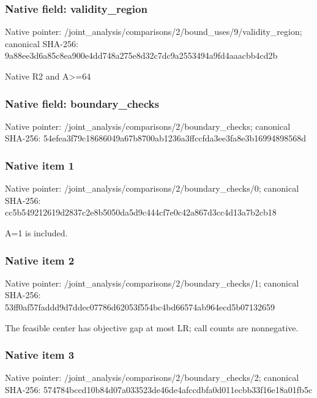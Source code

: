 \documentclass[10pt,a4paper]{article}
\begin{document}
\subsubsection{Native field: validity\_\allowbreak{}region}
Native pointer: /joint\_\allowbreak{}analysis/comparisons/2/bound\_\allowbreak{}uses/9/validity\_\allowbreak{}region; canonical SHA-256: 9a88ee3d6a85c8ea900e4dd748a275e8d32c7dc9a2553494a9fd4aaacbb4cd2b

\begingroup\raggedright\sloppy Native R2 and A>=\allowbreak{}64\par\endgroup

\subsubsection{Native field: boundary\_\allowbreak{}checks}
Native pointer: /joint\_\allowbreak{}analysis/comparisons/2/boundary\_\allowbreak{}checks; canonical SHA-256: 54efea3f79c18686049a67b8700ab1236a3ffccfda3ee3fa8e3b16994898568d

\subsubsection{Native item 1}
Native pointer: /joint\_\allowbreak{}analysis/comparisons/2/boundary\_\allowbreak{}checks/0; canonical SHA-256: cc5b549212619d2837c2e8b5050da5d9c444cf7e0c42a867d3cc4d13a7b2cb18

\begingroup\raggedright\sloppy A=\allowbreak{}1 is included.\par\endgroup

\subsubsection{Native item 2}
Native pointer: /joint\_\allowbreak{}analysis/comparisons/2/boundary\_\allowbreak{}checks/1; canonical SHA-256: 53ff0af57faddd9d7ddec07786d62053f554bc4bd66574ab964ecd5b07132659

\begingroup\raggedright\sloppy The feasible center has objective gap at most LR;\allowbreak{} call counts are nonnegative.\par\endgroup

\subsubsection{Native item 3}
Native pointer: /joint\_\allowbreak{}analysis/comparisons/2/boundary\_\allowbreak{}checks/2; canonical SHA-256: 574784bccd10b84d07a033523de46de4afccdbfa0d011ecbb33f16e18a01fb5c
\end{document}
